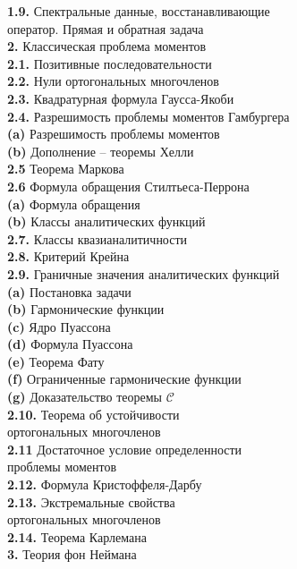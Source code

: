 \documentclass[12 pt, a4 paper]{article}
\theoremstyle{plain}   \newtheorem{Pro}{Задача}
\begin{document}
{\bfseries 1.9.}
Спектральные данные, восстанавливающие \\
оператор.
Прямая и обратная задача
$$ \; $$
{\Large \bfseries 2.}
Классическая проблема моментов \\
{\bfseries 2.1.}
Позитивные последовательности \\
{\bfseries 2.2.}
Нули ортогональных многочленов \\
{\bfseries 2.3.}
Квадратурная формула Гаусса-Якоби \\
{\bfseries 2.4.}
Разрешимость проблемы моментов Гамбургера \\
{\bfseries (a)}
Разрешимость проблемы моментов \\
{\bfseries (b)}
Дополнение -- теоремы Хелли \\
{\bfseries 2.5}
Теорема Маркова \\
{\bfseries 2.6}
Формула обращения Стилтьеса-Перрона \\
{\bfseries (a)}
Формула обращения \\
{\bfseries (b)}
Классы аналитических функций \\
{\bfseries 2.7.}
Классы квазианалитичности \\
{\bfseries 2.8.}
Критерий Крейна \\
{\bfseries 2.9.}
Граничные значения аналитических функций \\
{\bfseries (a)}
Постановка задачи \\
{\bfseries (b)}
Гармонические функции \\
{\bfseries (c)}
Ядро Пуассона \\
{\bfseries (d)}
Формула Пуассона \\
{\bfseries (e)}
Теорема Фату \\
{\bfseries (f)}
Ограниченные гармонические функции \\
{\bfseries (g)}
Доказательство теоремы $ \mathcal{C} $ \\
{\bfseries 2.10.}
Теорема об устойчивости \\
ортогональных многочленов \\
{\bfseries 2.11}
Достаточное условие определенности \\
проблемы моментов \\
{\bfseries 2.12.}
Формула Кристоффеля-Дарбу \\
{\bfseries 2.13.}
Экстремальные свойства \\
ортогональных многочленов \\
{\bfseries 2.14.}
Теорема Карлемана
$$ \; $$
{\Large \bfseries 3.}
Теория фон Неймана \\
\end{document}
